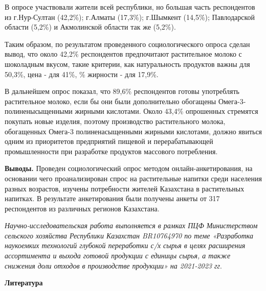 \begin{multicols}{2}
В опросе участвовали жители всей республики, но большая часть
респондентов из г.Нур-Султан (42,2\%); г.Алматы (17,3\%); г.Шымкент
(14,5\%); Павлодарской области (5,2\%) и Акмолинской области так же
(5,2\%).

Таким образом, по результатом проведенного социологического опроса
сделан вывод, что около 42,2\% респондентов предпочитают растительное
молоко с шоколадным вкусом, такие критерии, как натуральность продуктов
важны для 50,3\%, цена - для 41\%, \% жирности - для 17,9\%.

В дальнейшем опрос показал, что 89,6\% респондентов готовы употреблять
растительное молоко, если бы они были дополнительно обогащены
Омега-3-полиненысыщенными жирными кислотами. Около 43,4\% опрошенных
стремятся покупать новые изделия, поэтому производство растительного
молока, обогащенных Омега-3 полиненасыщенными жирными кислотами, должно
явиться одним из приоритетов предприятий пищевой и перерабатывающей
промышленности при разработке продуктов массового потребления.

{\bfseries Выводы.} Проведен социологический опрос методом
онлайн-анкетирования, на основании чего проанализирован спрос на
растительные напитки среди населения разных возрастов, изучены
потребности жителей Казахстана в растительных напитках. В результате
анкетирования были получены анкеты от 317 респондентов из различных
регионов Казахстана.

\emph{Научно-исследовательская работа выполняется в рамках ПЦФ
Министерством сельского хозяйства Республики Казахстан BR10764970 по
теме «Разработка наукоемких технологий глубокой переработки с/х сырья в
целях расширения ассортимента и выхода готовой продукции с единицы
сырья, а также снижения доли отходов в производстве продукции» на
2021-2023 гг}.
\end{multicols}

\begin{center}
{\bfseries Литература}
\end{center}


